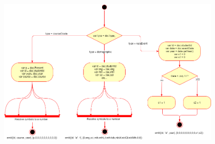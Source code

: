 \begin{figure}[ht]
    \centering
    \begin{mdframed}
        \centering
        \includegraphics[scale=0.35]{./resources/figures/activity-diagram-2.png}
    \end{mdframed}

\end{figure}
